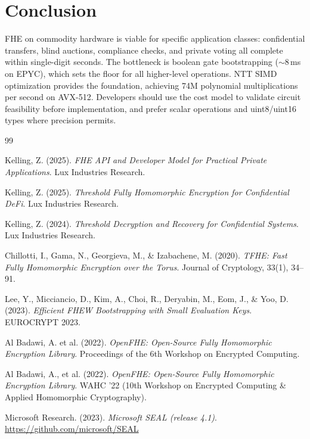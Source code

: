 \section{Conclusion}


FHE on commodity hardware is viable for specific application classes: confidential transfers, blind auctions, compliance checks, and private voting all complete within single-digit seconds. The bottleneck is boolean gate bootstrapping ($\sim$8\,ms on EPYC), which sets the floor for all higher-level operations. NTT SIMD optimization provides the foundation, achieving 74M polynomial multiplications per second on AVX-512. Developers should use the cost model to validate circuit feasibility before implementation, and prefer scalar operations and uint8/uint16 types where precision permits.

\begin{thebibliography}{99}

Kelling, Z. (2025).
\textit{FHE API and Developer Model for Practical Private Applications}.
Lux Industries Research.

Kelling, Z. (2025).
\textit{Threshold Fully Homomorphic Encryption for Confidential DeFi}.
Lux Industries Research.

Kelling, Z. (2024).
\textit{Threshold Decryption and Recovery for Confidential Systems}.
Lux Industries Research.

Chillotti, I., Gama, N., Georgieva, M., \& Izabachene, M. (2020).
\textit{TFHE: Fast Fully Homomorphic Encryption over the Torus}.
Journal of Cryptology, 33(1), 34--91.

Lee, Y., Micciancio, D., Kim, A., Choi, R., Deryabin, M., Eom, J., \& Yoo, D. (2023).
\textit{Efficient FHEW Bootstrapping with Small Evaluation Keys}.
EUROCRYPT 2023.

Al Badawi, A. et al. (2022).
\textit{OpenFHE: Open-Source Fully Homomorphic Encryption Library}.
Proceedings of the 6th Workshop on Encrypted Computing.


Al Badawi, A., et al. (2022).
\textit{OpenFHE: Open-Source Fully Homomorphic Encryption Library}.
WAHC '22 (10th Workshop on Encrypted Computing \& Applied Homomorphic Cryptography).

Microsoft Research. (2023).
\textit{Microsoft SEAL (release 4.1)}.
\url{https://github.com/microsoft/SEAL}


\end{thebibliography}
